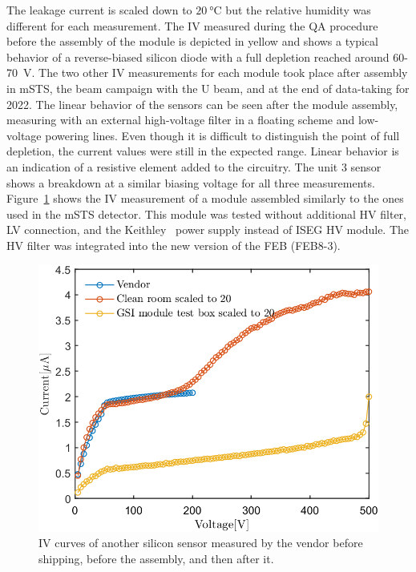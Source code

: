 The leakage current is scaled down to $\SI{20}{\celsius}$ but the relative humidity was different for each measurement. The IV measured during the QA procedure before the assembly of the module is depicted in yellow and shows a typical behavior of a reverse-biased silicon diode with a full depletion reached around 60-70~V. The two other IV measurements for each module took place after assembly in \gls{mSTS}, the beam campaign with the U beam, and at the end of data-taking for 2022. The linear behavior of the sensors can be seen after the module assembly, measuring with an external high-voltage filter in a floating scheme and low-voltage powering lines. Even though it is difficult to distinguish the point of full depletion, the current values were still in the expected range. Linear behavior is an indication of a resistive element added to the circuitry. The unit 3 sensor shows a breakdown at a similar biasing voltage for all three measurements. Figure~\ref{fig_IV_good} shows the IV measurement of a module assembled similarly to the ones used in the \gls{mSTS} detector. This module was tested without additional \gls{HV} filter, \gls{LV} connection, and the Keithley~\cite{Keithley} power supply instead of ISEG \gls{HV} module. The \gls{HV} filter was integrated into the new version of the \gls{FEB} (FEB8-3). 

\begin{figure}[!h]
\centering
\includegraphics[width=0.5\columnwidth]{Chapter6/DCS/images/IV/30304Whole.png}
\caption{IV curves of another silicon sensor measured by the vendor before shipping, before the assembly, and then after it.} 
\label{fig_IV_good}
\end{figure}

\newpage
